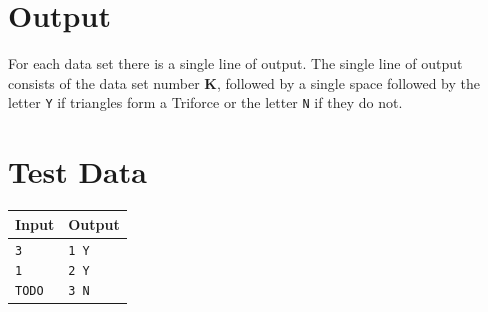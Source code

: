 \documentclass[11pt]{article}
\begin{document}
\section{Output}
For each data set there is a single line of output. The single line of output
consists of the data set number $\boldsymbol{K}$, followed by a single space
followed by the letter \texttt{Y} if triangles form a Triforce or the letter
\texttt{N} if they do not.

\section{Test Data}
\begin{tabularx}{\textwidth}{|X|X|}
	\hline
	Input & Output \\ \hline
	\parbox[t]{5cm}{
	\texttt{3\\
			1\\
      TODO
	}} &
	\parbox[t]{5cm}{
	\texttt{1 Y\\
			2 Y\\
			3 N\\
	}}\\
	\hline
\end{tabularx}
\end{document}
